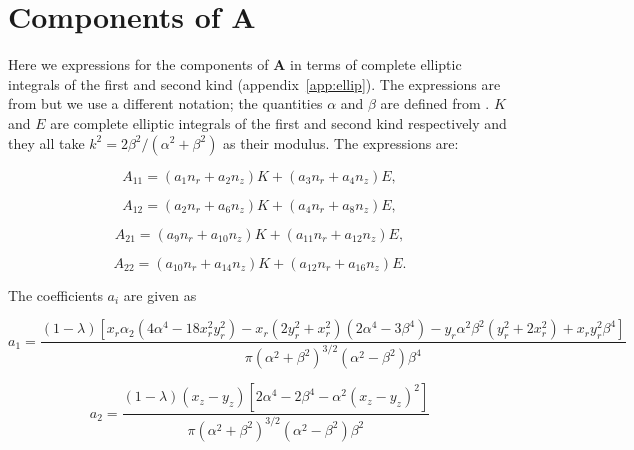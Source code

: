 \documentclass[12pt]{article}
\begin{document}
\section{Components of $\boldsymbol{A}$}
\label{app:mat_A}

Here we expressions for the components of $\boldsymbol{A}$ in terms of complete elliptic integrals of the first and second kind (appendix~\ref{app:ellip}). The expressions are from \citet{Graziani89} but we use a different notation; the quantities $\alpha$ and $\beta$ are defined from \citet{Manga94}. $K$ and $E$ are complete elliptic integrals of the first and second kind respectively and they all take $k^{2} = 2 \beta^{2} / (\alpha^{2} + \beta^{2})$ as their modulus. The expressions are:

\begin{equation}
\label{equ:A11_comp}
A_{11} = (a_{1} n_{r} + a_{2} n_{z})K + (a_{3} n_{r} + a_{4} n_{z})E,
\end{equation}

\begin{equation}
\label{equ:A12_comp}
A_{12} = (a_{2} n_{r} + a_{6} n_{z})K + (a_{4} n_{r} + a_{8} n_{z})E,
\end{equation}

\begin{equation}
\label{equ:A21_comp}
A_{21} = (a_{9} n_{r} + a_{10} n_{z})K + (a_{11} n_{r} + a_{12} n_{z})E,
\end{equation}

\begin{equation}
\label{equ:A22_comp}
A_{22} = (a_{10} n_{r} + a_{14} n_{z})K + (a_{12} n_{r} + a_{16} n_{z})E.
\end{equation}

The coefficients $a_{i}$ are given as

\begin{equation}
\label{equ:coeff_a1}
a_{1} = \frac{(1 - \lambda) [x_{r} \alpha_{2} (4 \alpha^{4} - 18 x_{r}^{2} y_{r}^{2}) - x_{r} (2 y_{r}^{2} + x_{r}^{2}) (2 \alpha^{4} - 3 \beta^{4}) - y_{r} \alpha^{2} \beta^{2} (y_{r}^{2} + 2 x_{r}^{2}) + x_{r} y_{r}^{2} \beta^{4}]}{\pi (\alpha^{2} + \beta^{2})^{3/2} (\alpha^{2} - \beta^{2}) \beta^{4}} 
\end{equation}

\begin{equation}
\label{equ:equ:coeff_a2}
a_{2} = \frac{(1 - \lambda) (x_{z} - y_{z}) [2 \alpha^{4} - 2 \beta^{4} - \alpha^{2} (x_{z} - y_{z})^{2}]}{\pi (\alpha^{2} + \beta^{2})^{3/2} (\alpha^{2} - \beta^{2}) \beta^{2}}
\end{equation}
\end{document}
